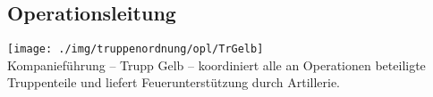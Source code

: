 \subsection{Operationsleitung}
\texttt{[image: ./img/truppenordnung/opl/TrGelb]}\\
Kompanieführung -- Trupp Gelb -- koordiniert alle an Operationen beteiligte Truppenteile und liefert Feuerunterstützung durch Artillerie.